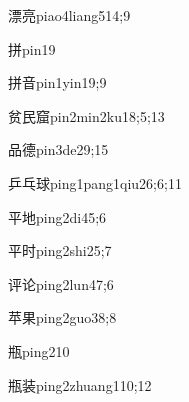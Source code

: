 \begin{verbete}{漂亮}{piao4liang5}{14;9}
\end{verbete}

\begin{verbete}{拼}{pin1}{9}
\end{verbete}

\begin{verbete}{拼音}{pin1yin1}{9;9}
\end{verbete}

\begin{verbete}{贫民窟}{pin2min2ku1}{8;5;13}
\end{verbete}

\begin{verbete}{品德}{pin3de2}{9;15}
\end{verbete}

\begin{verbete}{乒乓球}{ping1pang1qiu2}{6;6;11}
\end{verbete}

\begin{verbete}{平地}{ping2di4}{5;6}
\end{verbete}

\begin{verbete}{平时}{ping2shi2}{5;7}
\end{verbete}

\begin{verbete}{评论}{ping2lun4}{7;6}
\end{verbete}

\begin{verbete}{苹果}{ping2guo3}{8;8}
\end{verbete}

\begin{verbete}{瓶}{ping2}{10}
\end{verbete}

\begin{verbete}{瓶装}{ping2zhuang1}{10;12}
\end{verbete}

